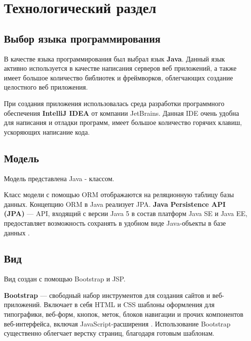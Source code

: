\chapter{Технологический раздел}

\section{Выбор языка программирования}
В качестве языка программирования был выбрал язык \textbf{Java}. Данный язык активно используется в качестве написания серверов веб приложений, а также имеет большое количество библиотек и фреймворков, облегчающих создание целостного веб приложения.

При создания приложения использовалась среда разработки программного обеспечения \textbf{IntelliJ IDEA} от компании JetBrains. Данная IDE очень удобна для написания и отладки программ, имеет большое количество горячих клавиш, ускоряющих написание кода.  

\section{Модель}

Модель представлена Java - классом.

 

Класс модели с помощью ORM отображаются на реляционную таблицу базы данных. Концепцию ORM в Java реализует JPA. \textbf{Java Persistence API (JPA)} — API, входящий с версии Java 5 в состав платформ Java SE и Java EE, предоставляет возможность сохранять в удобном виде Java-объекты в базе данных \cite{devcolibri-jpa}.

 

\section{Вид}

Вид создан с помощью Bootstrap и JSP.

\textbf{Bootstrap} — свободный набор инструментов для создания сайтов и веб-приложений. Включает в себя HTML и CSS шаблоны оформления для типографики, веб-форм, кнопок, меток, блоков навигации и прочих компонентов веб-интерфейса, включая JavaScript-расширения \cite{bootstrap}. Использование Bootstrap существенно облегчает верстку страниц, благодаря готовым шаблонам.

